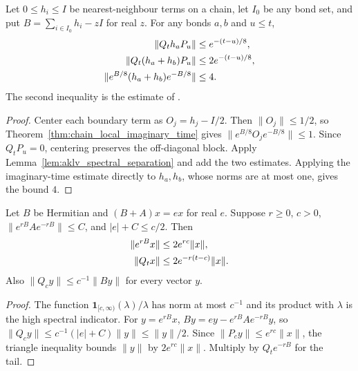 \begin{lemma}
    \label{thm:aklv_boundary_energy_tail}
    \leanok
    Let $0\le h_i\le I$ be nearest-neighbour terms on a chain, let $I_0$
    be any bond set, and put $B=\sum_{i\in I_0}h_i-zI$ for real $z$.
    For any bonds $a,b$ and $u\le t$,
    \begin{align}
        \|Q_th_aP_u\|                & \le e^{-(t-u)/8},\notag \\
        \|Q_t(h_a+h_b)P_u\|          & \le2e^{-(t-u)/8},\notag \\
        \|e^{B/8}(h_a+h_b)e^{-B/8}\| & \le4.
    \end{align}
    The second inequality is the estimate of
    \cite[Lemma~6.6(2)]{Arad2013AreaLaw}.
\end{lemma}
\begin{proof}\leanok
    Center each boundary term as $O_j=h_j-I/2$. Then $\|O_j\|\le1/2$,
    so Theorem~\ref{thm:chain_local_imaginary_time} gives
    $\|e^{B/8}O_je^{-B/8}\|\le1$. Since $Q_tP_u=0$, centering preserves
    the off-diagonal block. Apply Lemma~\ref{lem:aklv_spectral_separation}
    and add the two estimates. Applying the imaginary-time estimate directly
    to $h_a,h_b$, whose norms are at most one, gives the bound $4$.
\end{proof}

\begin{lemma}
    \label{lem:aklv_eigenvector_moment}
    \leanok
    Let $B$ be Hermitian and $(B+A)x=ex$ for real $e$.
    Suppose $r\ge0$, $c>0$, $\|e^{rB}Ae^{-rB}\|\le C$, and
    $|e|+C\le c/2$. Then
    \begin{align}
        \|e^{rB}x\| & \le2e^{rc}\|x\|,\notag \\
        \|Q_tx\|    & \le2e^{-r(t-c)}\|x\|.
    \end{align}
    Also $\|Q_cy\|\le c^{-1}\|By\|$ for every vector $y$.
\end{lemma}
\begin{proof}\leanok
    The function $\mathbf1_{[c,\infty)}(\lambda)/\lambda$ has norm at most
    $c^{-1}$ and its product with $\lambda$ is the high spectral indicator.
    For $y=e^{rB}x$, $By=ey-e^{rB}Ae^{-rB}y$, so
    $\|Q_cy\|\le c^{-1}(|e|+C)\|y\|\le\|y\|/2$.
    Since $\|P_cy\|\le e^{rc}\|x\|$, the triangle inequality bounds
    $\|y\|$ by $2e^{rc}\|x\|$. Multiply by $Q_te^{-rB}$ for the tail.
\end{proof}

